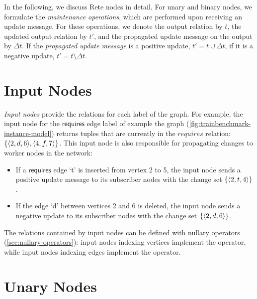 
In the following, we discuss Rete nodes in detail. For unary and binary nodes, we formulate the \emph{maintenance operations}, which are performed upon receiving an update message. For these operations, we denote the output relation by $t$, the updated output relation by $t'$, and the propagated update message on the output by $\Delta t$. If the \emph{propagated update message} is a positive update, $t' = t \cup \Delta t$, if it is a negative update, $t' = t \setminus \Delta t$.

\section{Input Nodes}


\emph{Input nodes} provide the relations for each label of the graph. For example, the input node for the $\mathsf{requires}$ edge label of example the graph (\autoref{fig:trainbenchmark-instance-model}) returns tuples that are currently in the $\mathit{requires}$ relation: $ \left\{ \langle 2, d, 6 \rangle, \langle 4, f, 7 \rangle \right\} $. This input node is also responsible for propagating changes to worker nodes in the network:

\begin{itemize}
	\item If a $\mathsf{requires}$ edge `t' is inserted from vertex 2 to 5, the input node sends a positive update message to its subscriber nodes with the change set $ \left\{ \langle 2, t, 4 \rangle \right\} $.
	\item If the edge `d' between vertices 2 and 6 is deleted, the input node sends a negative update to its subscriber nodes with the change set $ \left\{ \langle 2, d, 6 \rangle \right\} $.
\end{itemize}

The relations contained by input nodes can be defined with nullary operators (\autoref{sec:nullary-operators}): input nodes indexing vertices implement the \getverticestext operator, while input nodes indexing edges implement the \getedgestext operator.

\section{Unary Nodes}

